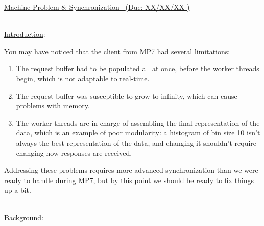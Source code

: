 \documentclass[12pt]{extarticle}
\newenvironment{myindentpar}[1]%
 {\begin{list}{}%
         {\setlength{\leftmargin}{#1}}%
         \item[]%
 }
 {\end{list}}
\newcommand{\duedate}{XX/XX/XX }
\begin{document}
\begin{center}
    \underline{{\large Machine Problem 8: Synchronization \  }(Due: \duedate)}  \\
\end{center}

\ \\
{\large \underline{Introduction}:}

\begin{myindentpar}{5mm}
    
	\noindent
	You may have noticed that the client from MP7 had several limitations:
	\begin{enumerate}
		\setlength\itemsep{-0.1em}	
	\item The request buffer had to be populated all at once, before the worker threads begin, which is not adaptable to real-time.
	\item The request buffer was susceptible to grow to infinity, which can cause problems with memory.
	\item The worker threads are in charge of assembling the final representation of the data, which is an example of poor modularity: a histogram of bin size 10 isn’t always the best representation of the data, and changing it shouldn’t require changing how responses are received.  
	\end{enumerate}
	Addressing these problems requires more advanced synchronization than we were ready to handle during MP7, but by this point we should be ready to fix things up a bit.
    
\end{myindentpar}

\ \\
{\large \underline{Background}:}
\end{document}
